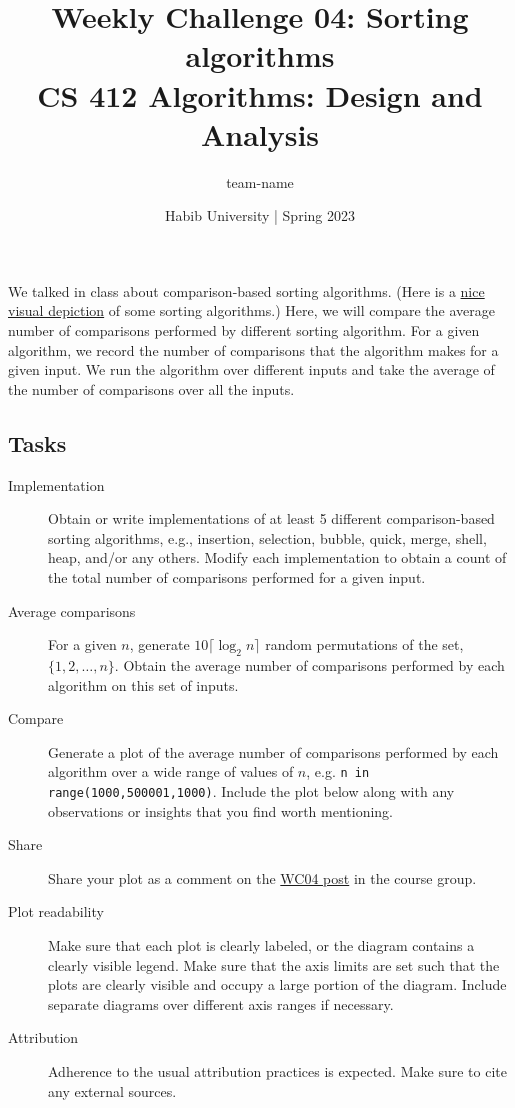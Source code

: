 \documentclass[a4paper]{exam}
\title{Weekly Challenge 04: Sorting algorithms\\CS 412 Algorithms: Design and Analysis}
\author{team-name}  %
\date{Habib University | Spring 2023}
\begin{document}
\maketitle

\begin{questions}

  

  We talked in class about comparison-based sorting algorithms. (Here is a \href{https://www.youtube.com/watch?v=kPRA0W1kECg&t=344s}{nice visual depiction} of some sorting algorithms.) Here, we will compare the average number of comparisons performed by different sorting algorithm.
  For a given algorithm, we record the number of comparisons that the algorithm makes for a given input. We run the algorithm over different inputs and take the average of the number of comparisons over all the inputs.

  \subsection*{Tasks}
  \begin{description}
  \item[Implementation] Obtain or write implementations of at least 5 different comparison-based sorting algorithms, e.g., insertion, selection, bubble, quick, merge, shell, heap, and/or any others. Modify each implementation to obtain a count of the total number of comparisons performed for a given input.
  \item[Average comparisons] For a given $n$, generate $10\lceil \log_2 n \rceil$ random permutations of the set, $\{1,2,\ldots,n\}$. Obtain the average number of comparisons performed by each algorithm on this set of inputs.
  \item[Compare] Generate a plot of the average number of comparisons performed by each algorithm over a wide range of values of $n$, e.g. \texttt{n in range(1000,500001,1000)}. Include the plot below along with any observations or insights that you find worth mentioning.
  \item[Share] Share your plot as a comment on the \href{https://web.yammer.com/main/org/habib.edu.pk/threads/eyJfdHlwZSI6IlRocmVhZCIsImlkIjoiMjExNDMxMzQ1MDUwNDE5MiJ9}{WC04 post} in the course group.
  \item[Plot readability] Make sure that each plot is clearly labeled, or the diagram contains a clearly visible legend. Make sure that the axis limits are set such that the plots are clearly visible and occupy a large portion of the diagram. Include separate diagrams over different axis ranges if necessary.
  \item[Attribution] Adherence to the usual attribution practices is expected. Make sure to cite any external sources.
  \end{description}
  
  \begin{solution}
  \end{solution}

\end{questions}
\end{document}
